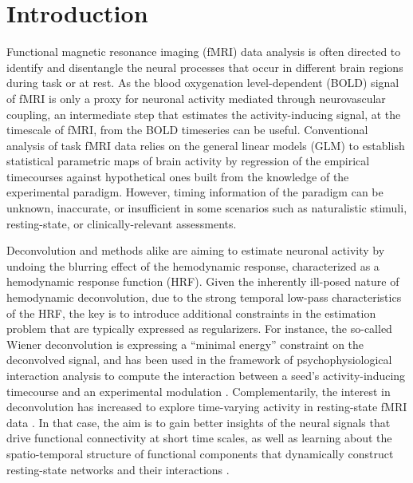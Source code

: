 
\section{Introduction}

Functional magnetic resonance imaging (fMRI) data analysis is often directed to
identify and disentangle the neural processes that occur in different brain
regions during task or at rest. As the blood oxygenation level-dependent (BOLD)
signal of fMRI is only a proxy for neuronal activity mediated through
neurovascular coupling, an intermediate step that estimates the
activity-inducing signal, at the timescale of fMRI, from the BOLD timeseries can
be useful. Conventional analysis of task fMRI data relies on the general linear
models (GLM) to establish statistical parametric maps of brain activity by
regression of the empirical timecourses against hypothetical ones built from the
knowledge of the experimental paradigm. However, timing information of the
paradigm can be unknown, inaccurate, or insufficient in some scenarios such as
naturalistic stimuli, resting-state, or clinically-relevant assessments.

Deconvolution and methods alike are aiming to estimate neuronal activity by
undoing the blurring effect of the hemodynamic response, characterized as a
hemodynamic response function (HRF). Given the inherently ill-posed nature of
hemodynamic deconvolution, due to the strong temporal low-pass characteristics
of the HRF, the key is to introduce additional constraints in the estimation
problem that are typically expressed as regularizers. For instance, the
so-called Wiener deconvolution is expressing a ``minimal energy'' constraint on
the deconvolved signal, and has been used in the framework of
psychophysiological interaction analysis to compute the interaction between a
seed's activity-inducing timecourse and an experimental modulation
\citep{Glover1999DeconvolutionImpulseResponse,Gitelman2003Modelingregionalpsychophysiologic,
Gerchen2014Analyzingtaskdependent,Di2018TaskConnectomicsExamining,
Freitas2020Timeresolvedeffective}.
Complementarily, the interest in deconvolution has increased to explore
time-varying activity in resting-state fMRI data
\citep{Preti2017dynamicfunctionalconnectome,Keilholz2017TimeResolvedResting,
Lurie2020Questionscontroversiesstudy,Bolton2020TappingMultiFaceted}.
In that case, the aim is to gain better insights of the neural signals that
drive functional connectivity at short time scales, as well as learning about
the spatio-temporal structure of functional components that dynamically
construct resting-state networks and their interactions
\citep{Karahanoglu2017Dynamicslargescale}.

